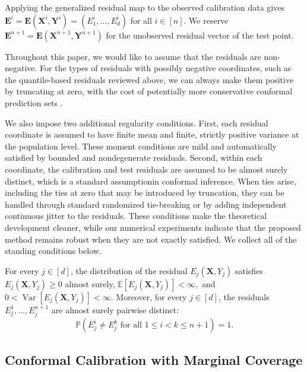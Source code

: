 {Applying the generalized residual map to the observed calibration data gives
$\mathbf{E}^i=\mathbf E(\mathbf X^i,\mathbf Y^i)=(E_1^i,\ldots,E_d^i)$ for all
$i\in[n]$. We reserve
$\mathbf{E}^{n+1}=\mathbf E(\mathbf X^{n+1},\mathbf Y^{n+1})$ for the
unobserved residual vector of the test point.

Throughout this paper, we would like to assume that the residuals are non-negative. For the types of residuals with possibly negative coordinates, such as the quantile-based residuals reviewed above, we can always make them positive by truncating at zero, with the cost of potentially more conservative conformal prediction sets \citep{romano2019conformalized}.

We also impose two additional regularity conditions. First, each residual
coordinate is assumed to have finite mean and finite, strictly positive
variance at the population level. These moment conditions are mild and automatically satisfied by bounded and nondegenerate
residuals. Second, within each
coordinate, the calibration and test residuals are assumed to be almost surely
distinct, which is a standard assumptionin conformal inference.
When ties arise, including the ties at zero that may be introduced by
truncation, they can be handled through standard randomized tie-breaking or
by adding independent continuous jitter to the residuals. These conditions
make the theoretical development cleaner, while our numerical experiments
indicate that the proposed method remains robust when they are not exactly
satisfied. We collect all of the standing conditions below.

\begin{assumption}
\label{eq:assumption-scores}
For every $j\in[d]$, the distribution of the residual $E_j(\mathbf X,Y_j)$ satisfies $E_j(\mathbf X,Y_j)\geq 0 $ almost surely, $
\mathbb E[E_j(\mathbf X,Y_j)]<\infty, $ and $
0<\operatorname{Var}[E_j(\mathbf X,Y_j)]<\infty.$
Moreover, for every $j\in[d]$, the residuals
$E_j^1,\ldots,E_j^{n+1}$ are almost surely pairwise distinct:
\[
\mathbb P\left(
E_j^i\neq E_j^k
\text{ for all }1\leq i<k\leq n+1
\right)=1.
\]
\end{assumption}
}


\subsection{Conformal Calibration with Marginal Coverage}\label{sec:calibration}

